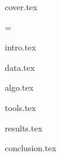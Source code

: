 \documentclass[11pt]{article}
\author{%
    Hafijul Hoque Chowdhury \\
    \texttt{1905013} \vspace{40pt} \\
    Syeda Rifah Tasfia \\
    \texttt{1905019} \vspace{40pt} \\
    Sardar Md. Saffat Zabin \\
    \texttt{1905060} \vspace{40pt} \\
    Anindya Hoque \\
    \texttt{1905070} \vspace{40pt} \\
    Asad Bin Shahid Mahin \\
    \texttt{1905087}
    }
\begin{document}
{cover.tex}

\newpage

\emergencystretch=\maxdimen


{intro.tex}

{data.tex}

{algo.tex}

{tools.tex}

{results.tex}

{conclusion.tex}






\end{document}
